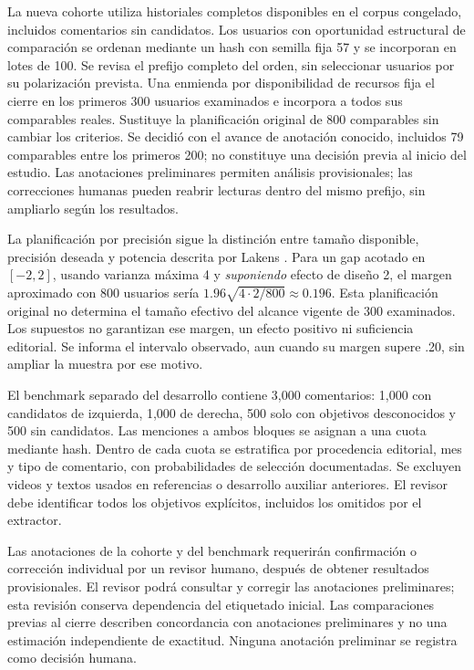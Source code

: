\documentclass[conference,letterpaper]{IEEEtran}
\begin{document}
La nueva cohorte utiliza historiales completos disponibles en el corpus congelado, incluidos comentarios sin candidatos. Los usuarios con oportunidad estructural de comparación se ordenan mediante un hash con semilla fija 57 y se incorporan en lotes de 100. Se revisa el prefijo completo del orden, sin seleccionar usuarios por su polarización prevista. Una enmienda por disponibilidad de recursos fija el cierre en los primeros 300 usuarios examinados e incorpora a todos sus comparables reales. Sustituye la planificación original de 800 comparables sin cambiar los criterios. Se decidió con el avance de anotación conocido, incluidos 79 comparables entre los primeros 200; no constituye una decisión previa al inicio del estudio. Las anotaciones preliminares permiten análisis provisionales; las correcciones humanas pueden reabrir lecturas dentro del mismo prefijo, sin ampliarlo según los resultados.

La planificación por precisión sigue la distinción entre tamaño disponible, precisión deseada y potencia descrita por Lakens \cite{lakens2022sample}. Para un gap acotado en $[-2,2]$, usando varianza máxima 4 y \emph{suponiendo} efecto de diseño 2, el margen aproximado con 800 usuarios sería $1.96\sqrt{4\cdot2/800}\approx0.196$. Esta planificación original no determina el tamaño efectivo del alcance vigente de 300 examinados. Los supuestos no garantizan ese margen, un efecto positivo ni suficiencia editorial. Se informa el intervalo observado, aun cuando su margen supere .20, sin ampliar la muestra por ese motivo.

El benchmark separado del desarrollo contiene 3,000 comentarios: 1,000 con candidatos de izquierda, 1,000 de derecha, 500 solo con objetivos desconocidos y 500 sin candidatos. Las menciones a ambos bloques se asignan a una cuota mediante hash. Dentro de cada cuota se estratifica por procedencia editorial, mes y tipo de comentario, con probabilidades de selección documentadas. Se excluyen videos y textos usados en referencias o desarrollo auxiliar anteriores. El revisor debe identificar todos los objetivos explícitos, incluidos los omitidos por el extractor.

Las anotaciones de la cohorte y del benchmark requerirán confirmación o corrección individual por un revisor humano, después de obtener resultados provisionales. El revisor podrá consultar y corregir las anotaciones preliminares; esta revisión conserva dependencia del etiquetado inicial. Las comparaciones previas al cierre describen concordancia con anotaciones preliminares y no una estimación independiente de exactitud. Ninguna anotación preliminar se registra como decisión humana.
\end{document}
